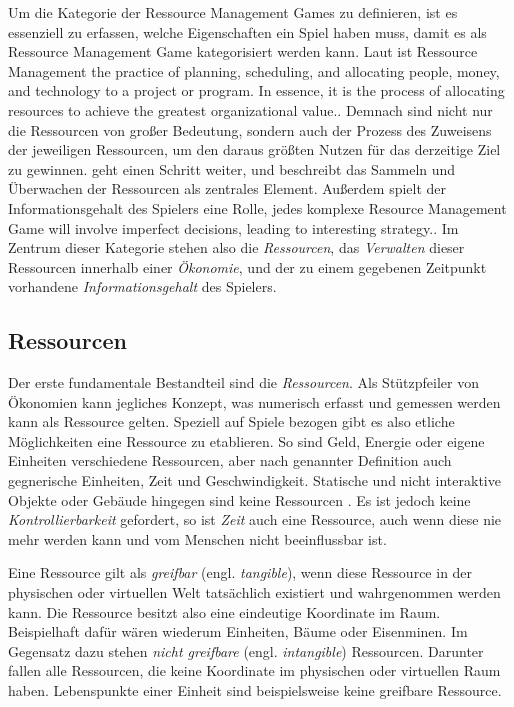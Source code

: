 
Um die Kategorie der Ressource Management Games zu definieren, ist es essenziell zu erfassen, welche Eigenschaften ein Spiel haben muss, damit es als Ressource Management Game kategorisiert werden kann. Laut \cite*[]{definition:ressourcemanagement} ist Ressource Management \glqq [...] the practice of planning, scheduling, and allocating people, money, and technology to a project or program. In essence, it is the process of allocating resources to achieve the greatest organizational value.\grqq. Demnach sind nicht nur die Ressourcen von großer Bedeutung, sondern auch der Prozess des Zuweisens der jeweiligen Ressourcen, um den daraus größten Nutzen für das derzeitige Ziel zu gewinnen. \cite*[]{definition:ressourcemanagementfandom} geht einen Schritt weiter, und beschreibt das Sammeln und Überwachen der Ressourcen als zentrales Element. Außerdem spielt der Informationsgehalt des Spielers eine Rolle, jedes komplexe Resource Management Game \glqq [...] will involve imperfect decisions, leading to interesting strategy.\grqq \cite*[]{definition:ressourcemanagementfandom}. 
Im Zentrum dieser Kategorie stehen also die \textit{Ressourcen}, das \textit{Verwalten} dieser Ressourcen innerhalb einer \textit{Ökonomie}, und der zu einem gegebenen Zeitpunkt vorhandene \textit{Informationsgehalt} des Spielers.

\subsection{Ressourcen}
Der erste fundamentale Bestandteil sind die \textit{Ressourcen}. Als Stützpfeiler von Ökonomien kann jegliches Konzept, was numerisch erfasst und gemessen werden kann als Ressource gelten. Speziell auf Spiele bezogen gibt es also etliche Möglichkeiten eine Ressource zu etablieren. So sind Geld, Energie oder eigene Einheiten verschiedene Ressourcen, aber nach genannter Definition auch gegnerische Einheiten, Zeit und Geschwindigkeit. Statische und nicht interaktive Objekte oder Gebäude hingegen sind keine Ressourcen \cite*[S.60]{book:gamedesign:resources}. Es ist jedoch keine \textit{Kontrollierbarkeit} gefordert, so ist \textit{Zeit} auch eine Ressource, auch wenn diese nie mehr werden kann und vom Menschen nicht beeinflussbar ist.

Eine Ressource gilt als \textit{greifbar} (engl. \textit{tangible}), wenn diese Ressource in der physischen oder virtuellen Welt tatsächlich existiert und wahrgenommen werden kann. Die Ressource besitzt also eine eindeutige Koordinate im Raum. Beispielhaft dafür wären wiederum Einheiten, Bäume oder Eisenminen. Im Gegensatz dazu stehen \textit{nicht greifbare} (engl. \textit{intangible}) Ressourcen. Darunter fallen alle Ressourcen, die keine Koordinate im physischen oder virtuellen Raum haben. Lebenspunkte einer Einheit sind beispielsweise keine greifbare Ressource. 

